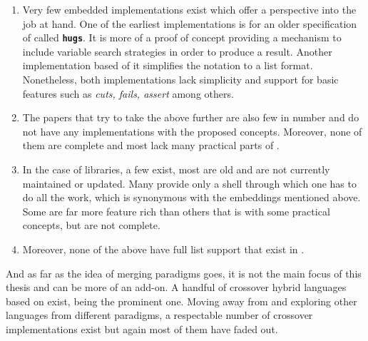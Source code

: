 \documentclass[thesis-solanki.tex]{subfiles}
\begin{document}
\begin{enumerate}
\item
  Very few embedded implementations exist which offer a perspective into the job at hand.
  One of the earliest implementations \cite{website:mini-prolog-hugs98} is for an older specification of
   called  \texttt{\bfseries{hugs}}.
  It is more of a proof of concept providing a mechanism to include variable search strategies in order to produce
  a result.
  Another implementation \cite{website:takashi-workplace} based of it simplifies the notation to a list format.
  Nonetheless, both implementations lack simplicity and support for basic  features such as
  \textit{cuts, fails, assert} among others.

\begin{comment}
\item
  Only two embeddings exist, one of them is old and made for \texttt{\bfseries{hugs}} a functional programming
  system based on the \progLang{Haskell 98} specification.
  It is complex and also lacks a lot of \progLang{Prolog} like features including \textit{cuts, fails, assert}
  among others.
  The second one is based off the first one to make it simple but it loses the variable search strategy support
  which allows the programmer to choose the manner in which a solution is produced.
\end{comment}

\item
  The papers that try to take the above further are also few in number and do not have any implementations with the
  proposed concepts.
  Moreover, none of them are complete and most lack many practical parts of .

\item
  In the case of libraries, a few exist, most are old and are not currently maintained or updated.
  Many provide only a shell through which one has to do all the work, which is synonymous with the embeddings
  mentioned above.
  Some are far more feature rich than others that is with some practical  concepts, but are not
  complete.

\item
  Moreover, none of the above have full list support that exist in .
\end{enumerate}

And as far as the idea of merging paradigms goes, it is not the main focus of this thesis and can be more of an
add-on.
A handful of crossover hybrid languages based on  exist,  \cite{website:curry}
being the prominent one.
Moving away from  and exploring other languages from different paradigms, a respectable number of
crossover implementations exist but again most of them have faded out.
\end{document}

